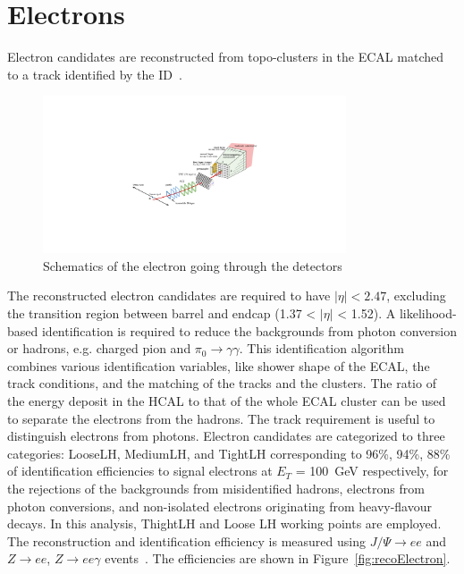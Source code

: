 \section{Electrons}
Electron candidates are reconstructed from topo-clusters in the ECAL matched to a track identified by the ID~\cite{ATL-PHYS-PUB-2017-022}.
\begin{figure}[tbp]
\begin{center}
 \includegraphics[width=0.80\textwidth,keepaspectratio]{figures/Reconstruction/electronPath}
\caption{
Schematics of the electron going through the detectors
}
\label{fig:electronPath}
\end{center}
\end{figure}
The reconstructed electron candidates are required to have $|\eta|<2.47$, excluding the transition region between barrel and endcap (1.37 < $|\eta|$ < 1.52).
A likelihood-based identification is required to reduce the backgrounds from photon conversion or hadrons, e.g. charged pion and $\pi_0 \rightarrow \gamma \gamma$. 
This identification algorithm combines various identification variables, like shower shape of the ECAL, the track conditions, and the matching of the tracks and the clusters. 
The ratio of the energy deposit in the HCAL to that of the whole ECAL cluster can be used to separate the electrons from the hadrons. 
The track requirement is useful to distinguish electrons from photons.
Electron candidates are categorized to three categories: LooseLH, MediumLH, and TightLH corresponding to 96\%, 94\%, 88\% of identification efficiencies to signal electrons at $E_T$ = 100~GeV respectively, for the rejections of the backgrounds from misidentified hadrons, electrons from photon conversions, and non-isolated electrons originating from heavy-flavour decays. 
In this analysis, ThightLH and Loose LH working points are employed.
The reconstruction and identification efficiency is measured using  $J/\Psi \rightarrow ee$ and $Z\rightarrow ee$, $Z\rightarrow ee\gamma$ events~\cite{PERF-2017-01}. The efficiencies are shown in Figure~\ref{fig:recoElectron}. 
